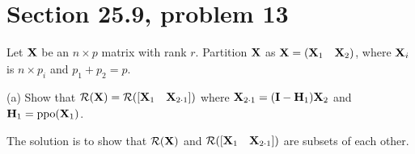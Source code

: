 \section{Section 25.9, problem 13}
Let $\bf X$ be an $n\times p$ matrix with rank $r$.
Partition $\bf X$ as ${\bf X}=(\begin{matrix}{\bf X}_1&{\bf X}_2
\end{matrix})$,
where ${\bf X}_i$ is $n\times p_i$ and $p_1+p_2=p$.

\bigskip
\noindent
(a) Show that
${\cal R}({\bf X})={\cal R}([\begin{matrix}{\bf X}_1&{\bf X}_{2\cdot1}
\end{matrix}])$
where
${\bf X}_{2\cdot1}=({\bf I}-{\bf H}_1){\bf X}_2$
and ${\bf H}_1=\mathop{\rm ppo}({\bf X}_1)$.

\bigskip
\noindent
The solution is to show that ${\cal R}({\bf X})$ and
${\cal R}([\begin{matrix}{\bf X}_1&{\bf X}_{2\cdot1}\end{matrix}])$
are subsets of each other.

